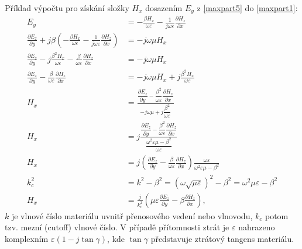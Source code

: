 \documentclass[12pt,a4paper,oneside]{article}
\numberwithin{equation}{section} %
\numberwithin{figure}{section} %
\numberwithin{table}{section} %
\begin{document}
Příklad výpočtu pro získání složky $H_x$ dosazením $E_y$ z \ref{maxpart5} do \ref{maxpart1}:
\begin{align*}
E_y &= - \frac{\beta H_x}{\omega \varepsilon} - \frac{1}{j \omega \varepsilon} \frac{\partial H_z}{\partial x}
\\
\frac{\partial E_z}{\partial y} + j \beta \left( - \frac{\beta H_x}{\omega \varepsilon} - \frac{1}{j \omega \varepsilon} \frac{\partial H_z}{\partial x} \right) &= -j \omega \mu H_x
\\
\frac{\partial E_z}{\partial y} - j \frac{\beta ^2 H_x}{\omega \varepsilon} - \frac{\beta}{\omega \varepsilon} \frac{\partial H_z}{\partial x} &= -j \omega \mu H_x
\\
\frac{\partial E_z}{\partial y} - \frac{\beta}{\omega \varepsilon} \frac{\partial H_z}{\partial x} &= -j \omega \mu H_x + j \frac{\beta ^2 H_x}{\omega \varepsilon}
\\
H_x &= \frac{\dfrac{\partial E_z}{\partial y} - \dfrac{\beta ^2}{\omega \varepsilon} \dfrac{\partial H_z}{\partial x}}{-j \omega \mu + j \dfrac{\beta ^2}{\omega \varepsilon}}
\\
H_x &= j \frac{\dfrac{\partial E_z}{\partial y} - \dfrac{\beta ^2}{\omega \varepsilon} \dfrac{\partial H_z}{\partial x}}{\dfrac{\omega ^2 \varepsilon \mu - \beta ^2}{\omega \varepsilon}}
\\
H_x &= j \left( \frac{\partial E_z}{\partial y} - \frac{\beta}{\omega \varepsilon} \frac{\partial H_z}{\partial x} \right) \frac{\omega \varepsilon}{\omega ^2 \varepsilon \mu - \beta ^2}
\\
k^2_c &= k^2 - \beta ^2 = {(\omega \sqrt{\mu \varepsilon})}^2 - \beta ^2 = \omega ^2 \mu \varepsilon - \beta ^2
\\
H_x &= \frac{j}{k^2_c} \left( \mu \varepsilon \frac{\partial E_z}{\partial y} - \beta \frac{\partial H_z}{\partial x} \right),
\end{align*}
$k$ je vlnové číslo materiálu uvnitř přenosového vedení nebo vlnovodu, $k_c$ potom tzv. mezní (cutoff) vlnové číslo. V případě přítomnosti ztrát je $\varepsilon$ nahrazeno komplexním $\varepsilon (1 - j \tan{\gamma})$, kde $\tan{\gamma}$ představuje ztrátový tangens materiálu.
\end{document}
